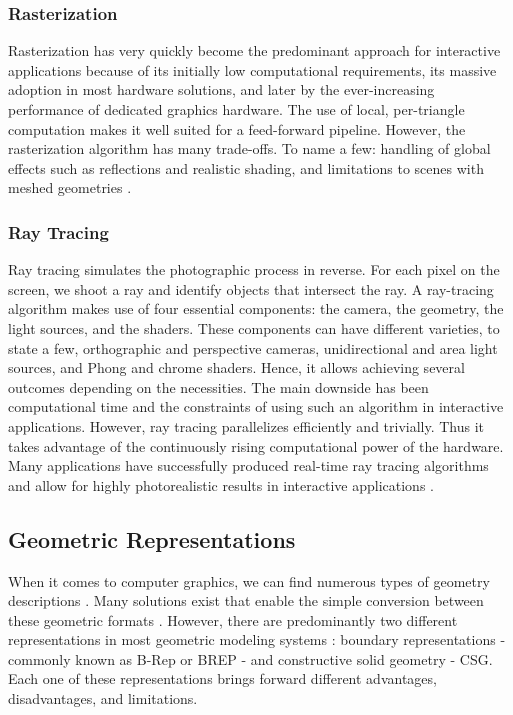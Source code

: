 \documentclass[a4paper,11pt,oneside]{article}
\begin{document}
\subsubsection{Rasterization}
    
Rasterization has very quickly become the predominant approach for interactive applications because of its initially low computational requirements, its massive adoption in most hardware solutions, and later by the ever-increasing performance of dedicated graphics hardware. The use of local, per-triangle computation makes it well suited for a feed-forward pipeline. However, the rasterization algorithm has many trade-offs. To name a few: handling of global effects such as reflections and realistic shading, and limitations to scenes with meshed geometries \cite{rasterization_scratch_pixel}. 
    
\subsubsection{Ray Tracing}
     
Ray tracing simulates the photographic process in reverse. For each pixel on the screen, we shoot a ray and identify objects that intersect the ray. A ray-tracing algorithm makes use of four essential components: the camera, the geometry, the light sources, and the shaders. These components can have different varieties, to state a few, orthographic and perspective cameras, unidirectional and area light sources, and Phong and chrome shaders. Hence, it allows achieving several outcomes depending on the necessities. The main downside has been computational time and the constraints of using such an algorithm in interactive applications. However, ray tracing parallelizes efficiently and trivially. Thus it takes advantage of the continuously rising computational power of the hardware. Many applications have successfully produced real-time ray tracing algorithms and allow for highly photorealistic results in interactive applications \cite{RT_RT1, RT_RT2}.
    
  
\subsection{Geometric Representations}
\label{sec:geometric_represections}

When it comes to computer graphics, we can find numerous types of geometry descriptions \cite{SOLIDREP_5, SOLIDREP_1, SOLIDREP_2, SOLIDREP_3, COMPUTING_SURVEYS,SOLIDREP_4}. Many solutions exist that enable the simple conversion between these geometric formats \cite{steuer_2012}. However, there are predominantly two different representations in most geometric modeling systems \cite{COMPUTING_SURVEYS}: boundary representations - commonly known as B-Rep or BREP - and constructive solid geometry - CSG. Each one of these representations brings forward different advantages, disadvantages, and limitations.
    
\end{document}
